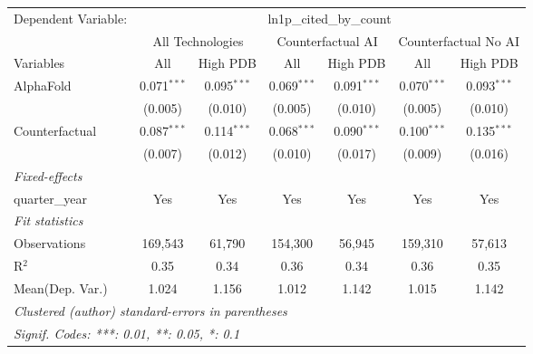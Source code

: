 \begingroup
\centering
\begin{tabular}{lcccccc}
   \tabularnewline \midrule \midrule
   Dependent Variable: & \multicolumn{6}{c}{ln1p\_cited\_by\_count}\\
 & \multicolumn{2}{c}{All Technologies} & \multicolumn{2}{c}{Counterfactual AI} & \multicolumn{2}{c}{Counterfactual No AI} \\
\cmidrule(lr){1-1}\cmidrule(lr){2-3} \cmidrule(lr){4-5} \cmidrule(lr){6-7}
Variables & \multicolumn{1}{c}{All} & \multicolumn{1}{c}{High PDB} & \multicolumn{1}{c}{All} & \multicolumn{1}{c}{High PDB} & \multicolumn{1}{c}{All} & \multicolumn{1}{c}{High PDB} \\
\cmidrule(lr){1-1}\cmidrule(lr){2-2} \cmidrule(lr){3-3} \cmidrule(lr){4-4} \cmidrule(lr){5-5} \cmidrule(lr){6-6} \cmidrule(lr){7-7}
   AlphaFold      & 0.071$^{***}$ & 0.095$^{***}$ & 0.069$^{***}$ & 0.091$^{***}$ & 0.070$^{***}$ & 0.093$^{***}$\\   
                  & (0.005)       & (0.010)       & (0.005)       & (0.010)       & (0.005)       & (0.010)\\   
   Counterfactual & 0.087$^{***}$ & 0.114$^{***}$ & 0.068$^{***}$ & 0.090$^{***}$ & 0.100$^{***}$ & 0.135$^{***}$\\   
                  & (0.007)       & (0.012)       & (0.010)       & (0.017)       & (0.009)       & (0.016)\\   
   \midrule
   \emph{Fixed-effects}\\
   quarter\_year  & Yes           & Yes           & Yes           & Yes           & Yes           & Yes\\  
   \midrule
   \emph{Fit statistics}\\
   Observations   & 169,543       & 61,790        & 154,300       & 56,945        & 159,310       & 57,613\\  
   R$^2$          & 0.35          & 0.34          & 0.36          & 0.34          & 0.36          & 0.35\\  
Mean(Dep. Var.) & 1.024 & 1.156 & 1.012 & 1.142 & 1.015 & 1.142 \\
   \midrule \midrule
   \multicolumn{7}{l}{\emph{Clustered (author) standard-errors in parentheses}}\\
   \multicolumn{7}{l}{\emph{Signif. Codes: ***: 0.01, **: 0.05, *: 0.1}}\\
\end{tabular}
\par\endgroup
